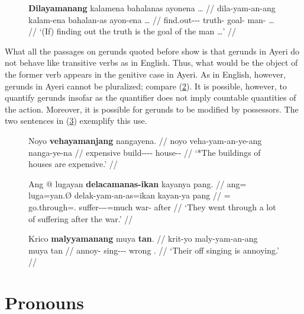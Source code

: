 \begin{figure}[h]
\ex\label{ex:scimethgerund}\begingl
	\gla \textbf{Dilayamanang} kalamena bahalanas ayonena … //
	\glb dila-yam-an-ang kalam-ena bahalan-as ayon-ena … //
	\glc find.out-\Ptcp{}-\Nmlz{}-\Aarg{} truth-\Gen{} goal-\Parg{} 
		man-\Gen{} … //
	\glft `(If) finding out the truth is the goal of the man …' //
\endgl\xe
\end{figure}

What all the passages on gerunds quoted before show is that gerunds in Ayeri do
not behave like transitive verbs as in English. Thus, what would be the object
of the former verb appears in the genitive case in Ayeri. As in English,
however, gerunds in Ayeri cannot be pluralized; compare (\ref{ex:grndplur}). It
is possible, however, to quantify gerunds insofar as the quantifier does not
imply countable quantities of the action. Moreover, it is possible for gerunds
to be modified by possessors. The two sentences in (\ref{ex:grndmod}) exemplify
this use.

\begin{figure}[h]
\ex\label{ex:grndplur}\ljudge*\begingl
	\gla Noyo \textbf{vehayamanjang} nangayena. //
	\glb noyo veha-yam-an-ye-ang nanga-ye-na //
	\glc expensive build-\Ptcp{}-\Nmlz{}-\Pl{}-\Aarg{} house-\Pl{}-\Gen{} //
	\glft `*The buildings of houses are expensive.' //
\endgl\xe
\end{figure}

\begin{figure}[h]
\pex\label{ex:grndmod}
\a\begingl
	\gla Ang @ lugayan \textbf{delacamanas-ikan} kayanya pang. //
	\glb ang= luga=yan.Ø delak-yam-an-as=ikan kayan-ya pang //
	\glc \AgtT{}= go.through=\TplM{}.\Top{} 
		suffer-\Ptcp{}-\Nmlz{}-\Parg{}=much war-\Loc{} after //
	\glft `They went through a lot of suffering after the war.' //
\endgl

\a\begingl
	\gla Krico \textbf{malyyamanang} muya \textbf{tan}. //
	\glb krit-yo maly-yam-an-ang muya tan //
	\glc annoy-\TsgN{} sing-\Ptcp{}-\Nmlz{}-\Aarg{} wrong \TplM{}.\Gen{} //
	\glft `Their off singing is annoying.' //
\endgl
\xe
\end{figure}


\section{Pronouns}

